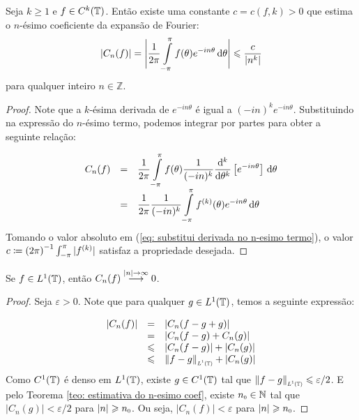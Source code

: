 \documentclass[../main.tex]{subfiles}
\begin{document}
\begin{teorema}
    \label{teo: estimativa do n-esimo coef}
    Seja $k \geqslant 1$ e $f\in C^k(\mathbb T)$. Então existe uma constante $c = c(f, k) > 0$ que estima o $n$-ésimo coeficiente da expansão de Fourier:
    $$
    |C_n(f)| = \Bigg|\dfrac{1}{2\pi}\int\limits_{-\pi}^\pi f(\theta) e^{-in\theta}\,{\operatorname{d}}{\theta}\Bigg|\leqslant \dfrac c{|n^k|}
    $$
    para qualquer inteiro $n \in \mathbb Z$.

    \begin{proof}
        Note que a $k$-ésima derivada de $e^{-in\theta}$ é igual a $(-in)^k e^{-in\theta}$. Substituindo na expressão do $n$-ésimo termo, podemos integrar por partes para obter a seguinte relação:

        \begin{equation}
        \label{eq: substitui derivada no n-esimo termo}
        \begin{array}{rcl}
            C_n(f) &=& \displaystyle \dfrac{1}{2\pi}\int\limits_{-\pi}^\pi f(\theta) \dfrac{1}{(-in)^k} \dfrac{{\operatorname{d}}{^k}}{{\operatorname{d}}{\theta}^k}\left[e^{-in\theta}\right]\,{\operatorname{d}}{\theta} \\
             &=& \displaystyle \dfrac{1}{2\pi}\dfrac{1}{(-in)^k}\int\limits_{-\pi}^\pi f^{(k)}(\theta)  e^{-in\theta}\,{\operatorname{d}}{\theta} \\
        \end{array}
        \end{equation}
        Tomando o valor absoluto em (\ref{eq: substitui derivada no n-esimo termo}), o valor $c \coloneqq {(2\pi)}^{-1} \int_{-\pi}^{\pi} |f^{(k)}|$ satisfaz a propriedade desejada.
    \end{proof}
\end{teorema}

\begin{lema}
    \label{lema: riemman lebesgue}
    Se $f\in L^1(\mathbb T)$, então $C_n(f)\overset{|n|\to \infty}{\longrightarrow} 0$.
    \begin{proof}
        Seja $\varepsilon > 0$. Note que para qualquer $g\in L^1(\mathbb T)$, temos a seguinte expressão: 
        
        \begin{equation*}
            \begin{array}{rcl}
                 |C_n(f)| &=& |C_n(f-g + g)| \\
                 &=& |C_n(f-g) + C_n(g)|\\
                 &\leqslant& |C_n(f-g)| + |C_n(g)|\\
                 &\leqslant& \sub{\|f-g\|}{L^1(\UnitalCircle)} + |C_n(g)|
            \end{array}
        \end{equation*}
        Como $C^1(\mathbb T)$ é denso em $L^1(\mathbb T)$, existe $g\in C^1(\mathbb T)$ tal que $\sub{\|f-g\|}{L^1(\UnitalCircle)} \leqslant \varepsilon/2$. E pelo Teorema \ref{teo: estimativa do n-esimo coef}, existe $\sub n0\in \N$ tal que $|C_n(g)| < \varepsilon/2$ para $|n|\geqslant \sub n0$. Ou seja, $|C_n(f)| < \varepsilon$ para $|n|\geqslant \sub n0$.
    \end{proof}
\end{lema}
\end{document}
